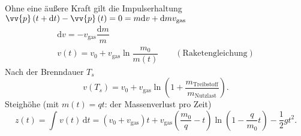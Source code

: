 \documentclass[a4paper,12pt]{article}
\newcommand{\td}{\,\text{d}}
\begin{document}
Ohne eine äußere Kraft gilt die Impulserhaltung $\vv{p}\left(t+\text{d}t\right)-\vv{p}\left(t\right)=0=m \text{d}v+\text{d}mv_{\text{gas}}$ 
\begin{gather*}
        \text{d}v=-v_{\text{gas}}\dfrac{\text{d}m}{m}\\
        v\left(t\right)=v_0+v_{\text{gas}}\ln\dfrac{m_0}{m\left(t\right)}\qquad \left(\text{Raketengleichung}\right)
\end{gather*}
Nach der Brenndauer $T_s$ 
\[ 
        v\left(T_s\right)=v_0+v_{\text{gas}}\ln\left(1+\dfrac{m_{\text{Treibstoff} }}{m_{\text{Nutzlast} }}\right)
.\] 
Steighöhe (mit $m\left(t\right)=qt$: der Massenverlust pro Zeit)
\[ 
        z\left(t\right)=\int_{}^{}v\left(t\right)\td t=\left(v_0+v_{\text{gas}}\right)t+v_{\text{gas}}\left(\dfrac{m_0}{q}-t\right)\ln\left(1-\dfrac{q}{m_0}t\right)-\dfrac{1}{2}gt^2
.\]
\end{document}
